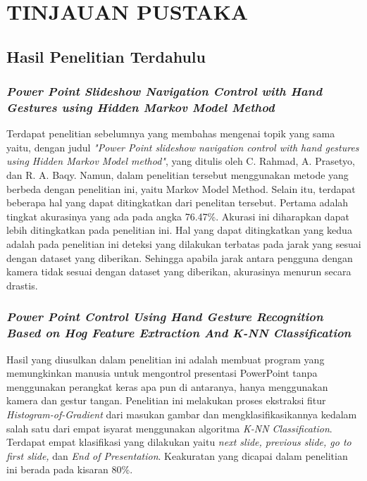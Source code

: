 \chapter{TINJAUAN PUSTAKA}
\label{chap:tinjauanpustaka}

\section{Hasil Penelitian Terdahulu}
\label{sec:hasilpenelitianterdahulu}
\subsection{\emph{Power Point Slideshow Navigation Control with Hand Gestures using Hidden Markov Model Method}}
\label{subsec:Power Point slideshow navigation control with hand gestures using Hidden Markov Model method}
Terdapat penelitian sebelumnya yang membahas mengenai topik yang sama yaitu, dengan judul \emph{"Power Point slideshow navigation control with hand gestures using Hidden Markov Model method"}, yang ditulis oleh C. Rahmad, A. Prasetyo, dan R. A. Baqy. Namun, dalam penelitian tersebut menggunakan metode yang berbeda dengan penelitian ini, yaitu Markov Model Method. Selain itu, terdapat beberapa hal yang dapat ditingkatkan dari penelitan tersebut. Pertama adalah tingkat akurasinya yang ada pada angka 76.47\%. Akurasi ini diharapkan dapat lebih ditingkatkan pada penelitian ini. Hal yang dapat ditingkatkan yang kedua adalah pada penelitian ini deteksi yang dilakukan terbatas pada jarak yang sesuai dengan dataset yang diberikan. Sehingga apabila jarak antara pengguna dengan kamera tidak sesuai dengan dataset yang diberikan, akurasinya menurun secara drastis.\parencite{Rahmad2022}

\subsection{\emph{Power Point Control Using Hand Gesture
Recognition Based on Hog Feature Extraction And
K-NN Classification}}
\label{subsec:Power Point Control Using Hand Gesture
Recognition Based on Hog Feature Extraction And
K-NN Classification}
Hasil yang diusulkan dalam penelitian ini adalah membuat program yang memungkinkan manusia untuk mengontrol presentasi PowerPoint tanpa menggunakan perangkat keras apa pun di antaranya, hanya menggunakan kamera dan gestur tangan. Penelitian ini melakukan proses ekstraksi fitur \emph{Histogram-of-Gradient} dari masukan gambar dan mengklasifikasikannya kedalam salah satu dari empat
isyarat menggunakan algoritma \emph{K-NN Classification}. Terdapat empat klasifikasi yang dilakukan yaitu \emph{next slide, previous slide, go to first slide,} dan \emph{End of Presentation}. Keakuratan yang dicapai dalam penelitian ini berada pada kisaran 80\%. 

